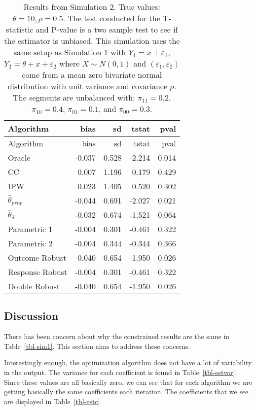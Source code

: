 \documentclass[
  letterpaper,
  DIV=11,
  numbers=noendperiod]{scrartcl}
\begin{document}
\hypertarget{tbl-sim2}{}
\begin{longtable}[]{@{}lrrrr@{}}
\caption{\label{tbl-sim2}Results from Simulation 2. True values:
\(\theta = 10, \rho = 0.5\). The test conducted for the T-statistic and
P-value is a two sample test to see if the estimator is unbiased. This
simulation uses the same setup as Simulation 1 with
\(Y_1 = x + \varepsilon_1\), \(Y_2 = \theta + x + \varepsilon_2\) where
\(X \sim N(0, 1)\) and \((\varepsilon_1, \varepsilon_2)\) come from a
mean zero bivariate normal distribution with unit variance and
covariance \(\rho\). The segments are unbalanced with:
\(\pi_{11} = 0.2\), \(\pi_{10} = 0.4\), \(\pi_{01} = 0.1\), and
\(\pi_{00} = 0.3\).}\tabularnewline
\toprule\noalign{}
Algorithm & bias & sd & tstat & pval \\
\midrule\noalign{}
\endfirsthead
\toprule\noalign{}
Algorithm & bias & sd & tstat & pval \\
\midrule\noalign{}
\endhead
\bottomrule\noalign{}
\endlastfoot
Oracle & -0.037 & 0.528 & -2.214 & 0.014 \\
CC & 0.007 & 1.196 & 0.179 & 0.429 \\
IPW & 0.023 & 1.405 & 0.520 & 0.302 \\
\(\hat \theta_{prop}\) & -0.044 & 0.691 & -2.027 & 0.021 \\
\(\hat \theta_{\delta}\) & -0.032 & 0.674 & -1.521 & 0.064 \\
Parametric 1 & -0.004 & 0.301 & -0.461 & 0.322 \\
Parametric 2 & -0.004 & 0.344 & -0.344 & 0.366 \\
Outcome Robust & -0.040 & 0.654 & -1.950 & 0.026 \\
Response Robust & -0.004 & 0.301 & -0.461 & 0.322 \\
Double Robust & -0.040 & 0.654 & -1.950 & 0.026 \\
\end{longtable}

\hypertarget{discussion}{%
\subsection*{Discussion}\label{discussion}}

There has been concern about why the constrained results are the same in
Table~\ref{tbl-sim1}. This section aims to address these concerns.

Interestingly enough, the optimization algorithm does not have a lot of
variability in the output. The variance for each coefficient is found in
Table~\ref{tbl-estvar}. Since these values are all basically zero, we
can see that for each algorithm we are getting basically the same
coefficients each iteration. The coefficients that we see are displayed
in Table~\ref{tbl-estc}.
\end{document}
